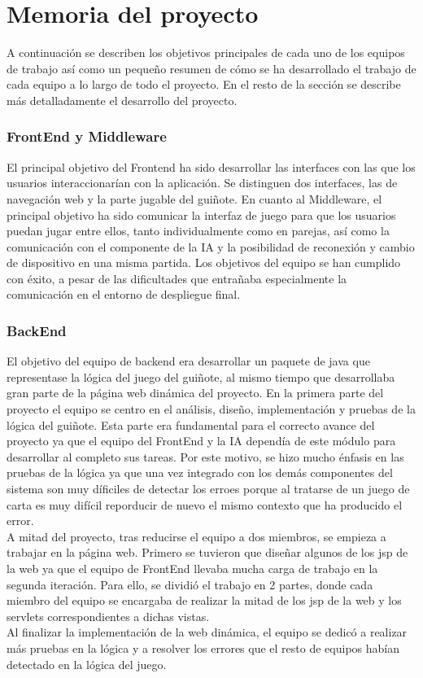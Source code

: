 \section{Memoria del proyecto}
\label{memoria}
A continuación se describen los objetivos principales de cada uno de los equipos de trabajo así como un pequeño resumen de cómo se ha desarrollado el trabajo de cada equipo a lo largo de todo el proyecto. En el resto de la sección se describe más detalladamente el desarrollo del proyecto.\\

\subsubsection*{FrontEnd y Middleware}
El principal objetivo del Frontend ha sido desarrollar las interfaces con las que los usuarios interaccionarían con la aplicación. Se distinguen dos interfaces, las de navegación web y la parte jugable del guiñote. En cuanto al Middleware, el principal objetivo ha sido comunicar la interfaz de juego para que los usuarios puedan jugar entre ellos, tanto individualmente como en parejas, así como la comunicación con el componente de la IA y la posibilidad de reconexión y cambio de dispositivo en una misma partida. Los objetivos del equipo se han cumplido con éxito, a pesar de las dificultades que entrañaba especialmente la comunicación en el entorno de despliegue final.

\subsubsection*{BackEnd}
El objetivo del equipo de backend era desarrollar un paquete de java que representase la lógica del juego del guiñote, al mismo tiempo que desarrollaba gran parte de la página web dinámica del proyecto. En la primera parte del proyecto el equipo se centro en el análisis, diseño, implementación y pruebas de la lógica del guiñote. Esta parte era fundamental para el correcto avance del proyecto ya que el equipo del FrontEnd y la IA dependía de este módulo para desarrollar al completo sus tareas. Por este motivo, se hizo mucho énfasis en las pruebas de la lógica ya que una vez integrado con los demás componentes del sistema son muy díficiles de detectar los erroes porque al tratarse de un juego de carta es muy difícil reporducir de nuevo el mismo contexto que ha producido el error. \\
A mitad del proyecto, tras reducirse el equipo a dos miembros, se empieza a trabajar en la página web. Primero se tuvieron que diseñar algunos de los jsp de la web ya que el equipo de FrontEnd llevaba mucha carga de trabajo en la segunda iteración. Para ello, se dividió el trabajo en 2 partes, donde cada miembro del equipo se encargaba de realizar la mitad de los jsp de la web y los servlets correspondientes a dichas vistas. \\
Al finalizar la implementación de la web dinámica, el equipo se dedicó a realizar más pruebas en la lógica y a resolver los errores que el resto de equipos habían detectado en la lógica del juego. 

